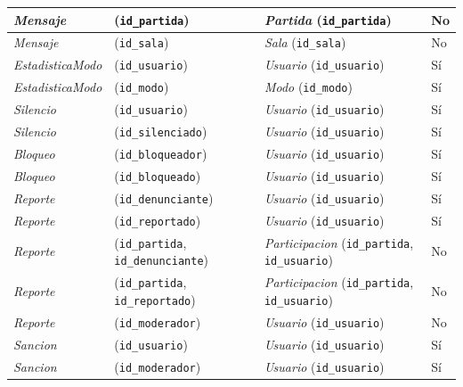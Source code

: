 \begin{center}
\begin{longtable}{|L{0.21\textwidth}|L{0.26\textwidth}|L{0.29\textwidth}|L{0.12\textwidth}|}
\textit{Mensaje} & (\texttt{id\_\allowbreak{}partida}) & \textit{Partida} (\texttt{id\_\allowbreak{}partida}) & No \\ \hline
\textit{Mensaje} & (\texttt{id\_\allowbreak{}sala}) & \textit{Sala} (\texttt{id\_\allowbreak{}sala}) & No \\ \hline
\textit{Estadistica\-Modo} & (\texttt{id\_\allowbreak{}usuario}) & \textit{Usuario} (\texttt{id\_\allowbreak{}usuario}) & Sí \\ \hline
\textit{Estadistica\-Modo} & (\texttt{id\_\allowbreak{}modo}) & \textit{Modo} (\texttt{id\_\allowbreak{}modo}) & Sí \\ \hline
\textit{Silencio} & (\texttt{id\_\allowbreak{}usuario}) & \textit{Usuario} (\texttt{id\_\allowbreak{}usuario}) & Sí \\ \hline
\textit{Silencio} & (\texttt{id\_\allowbreak{}silenciado}) & \textit{Usuario} (\texttt{id\_\allowbreak{}usuario}) & Sí \\ \hline
\textit{Bloqueo} & (\texttt{id\_\allowbreak{}bloqueador}) & \textit{Usuario} (\texttt{id\_\allowbreak{}usuario}) & Sí \\ \hline
\textit{Bloqueo} & (\texttt{id\_\allowbreak{}bloqueado}) & \textit{Usuario} (\texttt{id\_\allowbreak{}usuario}) & Sí \\ \hline
\textit{Reporte} & (\texttt{id\_\allowbreak{}denunciante}) & \textit{Usuario} (\texttt{id\_\allowbreak{}usuario}) & Sí \\ \hline
\textit{Reporte} & (\texttt{id\_\allowbreak{}reportado}) & \textit{Usuario} (\texttt{id\_\allowbreak{}usuario}) & Sí \\ \hline
\textit{Reporte} & (\texttt{id\_\allowbreak{}partida}, \texttt{id\_\allowbreak{}denunciante}) & \textit{Participacion} (\texttt{id\_\allowbreak{}partida}, \texttt{id\_\allowbreak{}usuario}) & No \\ \hline
\textit{Reporte} & (\texttt{id\_\allowbreak{}partida}, \texttt{id\_\allowbreak{}reportado}) & \textit{Participacion} (\texttt{id\_\allowbreak{}partida}, \texttt{id\_\allowbreak{}usuario}) & No \\ \hline
\textit{Reporte} & (\texttt{id\_\allowbreak{}moderador}) & \textit{Usuario} (\texttt{id\_\allowbreak{}usuario}) & No \\ \hline
\textit{Sancion} & (\texttt{id\_\allowbreak{}usuario}) & \textit{Usuario} (\texttt{id\_\allowbreak{}usuario}) & Sí \\ \hline
\textit{Sancion} & (\texttt{id\_\allowbreak{}moderador}) & \textit{Usuario} (\texttt{id\_\allowbreak{}usuario}) & Sí \\ \hline

\end{longtable}
\end{center}
